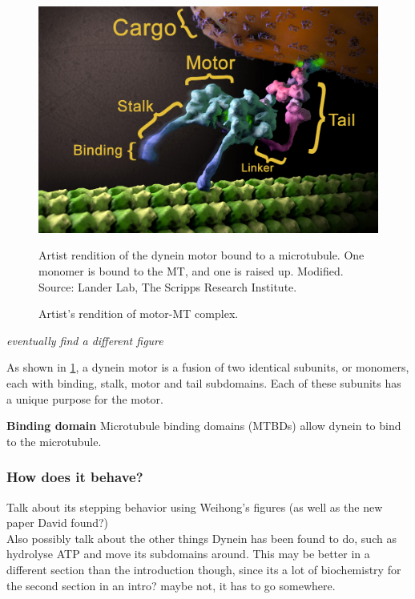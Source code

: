 \documentclass[10pt]{article} %
\begin{document}
\begin{figure}[h]
  \centering
  \includegraphics[width=.65\textwidth,keepaspectratio]{../../figures/dynein-artist-rendition.jpg}
  \caption{Artist's rendition of motor-MT complex.}{Artist rendition of the dynein motor bound to a microtubule. One monomer is bound to the MT, and one is raised up. Modified. Source: Lander Lab, The Scripps Research Institute.}
  \label{dynein-artist-rendition-2}
\end{figure}

\textit{eventually find a different figure}

As shown in \ref{dynein-artist-rendition-2}, a dynein motor is a fusion of two identical subunits, or monomers, each with binding, stalk, motor and tail subdomains. Each of these subunits has a unique purpose for the motor.

\textbf{Binding domain}
Microtubule binding domains (MTBDs) allow dynein to bind to the microtubule. 


\subsubsection{How does it behave?}
Talk about its stepping behavior using Weihong's figures (as well as the new paper David found?)\\

Also possibly talk about the other things Dynein has been found to do, such as hydrolyse ATP and move its subdomains around. This may be better in a different section than the introduction though, since its a lot of biochemistry for the second section in an intro? maybe not, it has to go somewhere.
\end{document}
